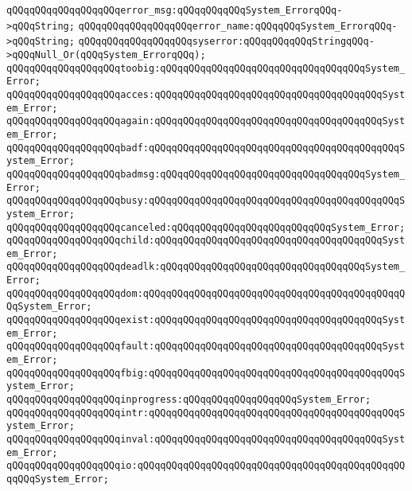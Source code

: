 \verb|qQQqqQQqqQQqqQQqqQQqerror_msg:qQQqqQQqqQQqSystem_ErrorqQQq->qQQqString;|\newline
\verb|qQQqqQQqqQQqqQQqqQQqerror_name:qQQqqQQqSystem_ErrorqQQq->qQQqString;|\newline
\verb|qQQqqQQqqQQqqQQqqQQqsyserror:qQQqqQQqqQQqStringqQQq->qQQqNull_Or(qQQqSystem_ErrorqQQq);|\newline
\newline
\verb|qQQqqQQqqQQqqQQqqQQqtoobig:qQQqqQQqqQQqqQQqqQQqqQQqqQQqqQQqqQQqSystem_Error;|\newline
\verb|qQQqqQQqqQQqqQQqqQQqacces:qQQqqQQqqQQqqQQqqQQqqQQqqQQqqQQqqQQqqQQqSystem_Error;|\newline
\verb|qQQqqQQqqQQqqQQqqQQqagain:qQQqqQQqqQQqqQQqqQQqqQQqqQQqqQQqqQQqqQQqSystem_Error;|\newline
\verb|qQQqqQQqqQQqqQQqqQQqbadf:qQQqqQQqqQQqqQQqqQQqqQQqqQQqqQQqqQQqqQQqqQQqSystem_Error;|\newline
\verb|qQQqqQQqqQQqqQQqqQQqbadmsg:qQQqqQQqqQQqqQQqqQQqqQQqqQQqqQQqqQQqSystem_Error;|\newline
\verb|qQQqqQQqqQQqqQQqqQQqbusy:qQQqqQQqqQQqqQQqqQQqqQQqqQQqqQQqqQQqqQQqqQQqSystem_Error;|\newline
\verb|qQQqqQQqqQQqqQQqqQQqcanceled:qQQqqQQqqQQqqQQqqQQqqQQqqQQqSystem_Error;|\newline
\verb|qQQqqQQqqQQqqQQqqQQqchild:qQQqqQQqqQQqqQQqqQQqqQQqqQQqqQQqqQQqqQQqSystem_Error;|\newline
\verb|qQQqqQQqqQQqqQQqqQQqdeadlk:qQQqqQQqqQQqqQQqqQQqqQQqqQQqqQQqqQQqSystem_Error;|\newline
\verb|qQQqqQQqqQQqqQQqqQQqdom:qQQqqQQqqQQqqQQqqQQqqQQqqQQqqQQqqQQqqQQqqQQqqQQqSystem_Error;|\newline
\verb|qQQqqQQqqQQqqQQqqQQqexist:qQQqqQQqqQQqqQQqqQQqqQQqqQQqqQQqqQQqqQQqSystem_Error;|\newline
\verb|qQQqqQQqqQQqqQQqqQQqfault:qQQqqQQqqQQqqQQqqQQqqQQqqQQqqQQqqQQqqQQqSystem_Error;|\newline
\verb|qQQqqQQqqQQqqQQqqQQqfbig:qQQqqQQqqQQqqQQqqQQqqQQqqQQqqQQqqQQqqQQqqQQqSystem_Error;|\newline
\verb|qQQqqQQqqQQqqQQqqQQqinprogress:qQQqqQQqqQQqqQQqqQQqSystem_Error;|\newline
\verb|qQQqqQQqqQQqqQQqqQQqintr:qQQqqQQqqQQqqQQqqQQqqQQqqQQqqQQqqQQqqQQqqQQqSystem_Error;|\newline
\verb|qQQqqQQqqQQqqQQqqQQqinval:qQQqqQQqqQQqqQQqqQQqqQQqqQQqqQQqqQQqqQQqSystem_Error;|\newline
\verb|qQQqqQQqqQQqqQQqqQQqio:qQQqqQQqqQQqqQQqqQQqqQQqqQQqqQQqqQQqqQQqqQQqqQQqqQQqSystem_Error;|\newline

